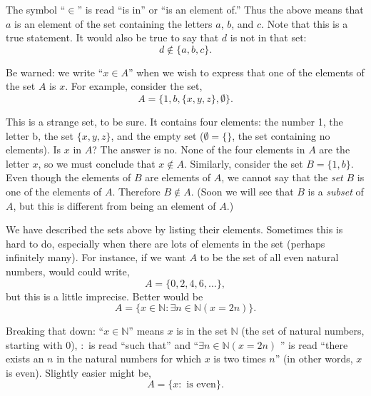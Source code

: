\documentclass[10pt,]{book}
\theoremstyle{plain}
\theoremstyle{definition}
\theoremstyle{definition}
\theoremstyle{definition}
\def\N{\mathbb N}
\def\st{:}
\begin{document}
      The symbol ``\(\in\)'' is read ``is in'' or ``is an element of.'' Thus the above means that \(a\) is an element of the set containing the letters \(a\), \(b\), and \(c\). Note that this is a true statement. It would also be true to say that \(d\) is not in that set:
      \begin{equation*}
        d \not\in \{a, b, c\}.
      \end{equation*}
\par

      Be warned: we write ``\(x \in A\)'' when we wish to express that one of the elements of the set \(A\) is \(x\). For example, consider the set,
      \begin{equation*}
        A = \{1, b, \{x, y, z\}, \emptyset\}.
      \end{equation*}
\par

      This is a strange set, to be sure. It contains four elements: the number 1, the letter b, the set \(\{x,y,z\}\), and the empty set (\(\emptyset = \{ \}\), the set containing no elements). Is \(x\) in \(A\)? The answer is no. None of the four elements in \(A\) are the letter \(x\), so we must conclude that \(x \notin A\). Similarly, consider the set \(B = \{1,b\}\). Even though the elements of \(B\) are elements of \(A\), we cannot say that the \emph{set} \(B\) is one of the elements of \(A\). Therefore \(B \notin A\). (Soon we will see that \(B\) is a \emph{subset} of \(A\), but this is different from being an element of \(A\).)
\par

      We have described the sets above by listing their elements. Sometimes this is hard to do, especially when there are lots of elements in the set (perhaps infinitely many). For instance, if we want \(A\) to be the set of all even natural numbers, would could write,
      \begin{equation*}
        A = \{0, 2, 4, 6, \ldots\},
      \end{equation*}
      but this is a little imprecise. Better would be
      \begin{equation*}
        A = \{x \in \N \st \exists n\in \N ( x = 2 n)\}.
      \end{equation*}
\par

      Breaking that down: ``\(x \in \N\)'' means \(x\) is in the set \(\N\) \label{notation-2}
 (the set of natural numbers, starting with 0), \(:\) \label{notation-3}
 is read ``such that'' and ``\(\exists n\in \N (x = 2n) \)
      '' is read ``there exists an \(n\) in the natural numbers for which \(x\) is two times \(n\)'' (in other words, \(x\) is even). Slightly easier might be,
      \begin{equation*}
        A = \{x \st \mbox{  is even} \}.
      \end{equation*}
\par
\end{document}
